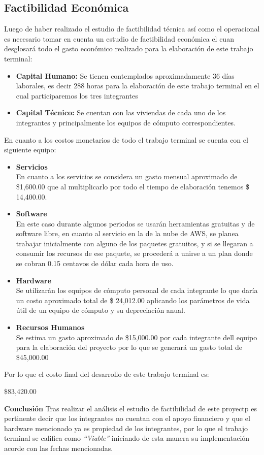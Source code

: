 \documentclass[12pt, a4paper, titlepage]{report}
\begin{document}
    	\subsection{Factibilidad Económica}
    	Luego de haber realizado el estudio de factibilidad técnica así como el operacional es necesario tomar en cuenta un estudio de factibilidad económica el cuan desglosará todo el gasto económico realizado para la elaboración de este trabajo terminal:
    	\begin{itemize}
    		\item \textbf{Capital Humano:} Se tienen contemplados aproximadamente 36 días laborales, es decir 288 horas para la elaboración de este trabajo terminal en el cual participaremos los tres integrantes
    		\item \textbf{Capital Técnico:} Se cuentan con las viviendas de cada uno de los integrantes y principalmente los equipos de cómputo correspondientes.
    	\end{itemize}
    	En cuanto a los costos monetarios de todo el trabajo terminal se cuenta con el siguiente equipo:
    	\begin{itemize}
    		\item \textbf{Servicios}\\
    		En cuanto a los servicios se considera un gasto mensual aproximado de \$1,600.00 que al multiplicarlo por todo el tiempo de elaboración tenemos \$ 14,400.00.
    		\item \textbf{Software} \\
    		En este caso durante algunos periodos se usarán herramientas gratuitas y de software libre, en cuanto al servicio en la de la nube de AWS, se planea trabajar inicialmente con alguno de los paquetes gratuitos, y si se llegaran a consumir los recursos de ese paquete, se procederá a unirse a un plan donde se cobran 0.15 centavos de dólar cada hora de uso.
    		\item \textbf{Hardware}\\
    		Se utilizarán los equipos de cómputo personal de cada integrante lo que daría un costo aproximado total de \$ 24,012.00 aplicando los parámetros de vida útil de un equipo de cómputo y su depreciación anual. 
    		\item \textbf{Recursos Humanos}\\
    		Se estima un gasto aproximado de \$15,000.00 por cada integrante dell equipo para la elaboración del proyecto por lo que se generará un gasto total de \$45,000.00
    	\end{itemize}
    	Por lo que el costo final del desarrollo de este trabajo terminal es: \\
    	\begin{center}
    		\$83,420.00
    	\end{center}
    	\textbf{Conclusión} 
    	Tras realizar el análisis el estudio de factibilidad de este proyectp es pertinente decir que los integrantes no cuentan con el apoyo financiero y que el hardware mencionado ya es propiedad de los integrantes, por lo que el trabajo terminal se califica como \textit{“Viable”} iniciando de esta manera su implementación acorde con las fechas mencionadas.
    	    
\end{document}
